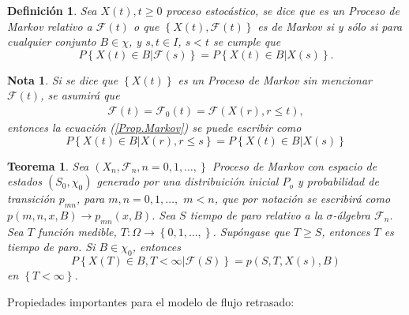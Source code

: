 \documentclass{article}
\newtheorem{Def}{Definición}
\newtheorem{Teo}{Teorema}
\newtheorem{Note}{Nota}
\begin{document}
\begin{Def}
Sea $X\left(t\right),t\geq0$ proceso estoc\'astico, se dice que es un Proceso de Markov relativo a $\mathcal{F}\left(t\right)$ o que $\left\{X\left(t\right),\mathcal{F}\left(t\right)\right\}$ es de Markov si y s\'olo si para cualquier conjunto $B\in\chi$,  y $s,t\in I$, $s<t$ se cumple que
\begin{equation}\label{Prop.Markov}
P\left\{X\left(t\right)\in B|\mathcal{F}\left(s\right)\right\}=P\left\{X\left(t\right)\in B|X\left(s\right)\right\}.
\end{equation}
\end{Def}
\begin{Note}
Si se dice que $\left\{X\left(t\right)\right\}$ es un Proceso de Markov sin mencionar $\mathcal{F}\left(t\right)$, se asumir\'a que
\begin{eqnarray*}
\mathcal{F}\left(t\right)=\mathcal{F}_{0}\left(t\right)=\mathcal{F}\left(X\left(r\right),r\leq t\right),
\end{eqnarray*}
entonces la ecuaci\'on (\ref{Prop.Markov}) se puede escribir como
\begin{equation}
P\left\{X\left(t\right)\in B|X\left(r\right),r\leq s\right\} = P\left\{X\left(t\right)\in B|X\left(s\right)\right\}
\end{equation}
\end{Note}

\begin{Teo}
Sea $\left(X_{n},\mathcal{F}_{n},n=0,1,\ldots,\right\}$ Proceso de Markov con espacio de estados $\left(S_{0},\chi_{0}\right)$ generado por una distribuici\'on inicial $P_{o}$ y probabilidad de transici\'on $p_{mn}$, para $m,n=0,1,\ldots,$ $m<n$, que por notaci\'on se escribir\'a como $p\left(m,n,x,B\right)\rightarrow p_{mn}\left(x,B\right)$. Sea $S$ tiempo de paro relativo a la $\sigma$-\'algebra $\mathcal{F}_{n}$. Sea $T$ funci\'on medible, $T:\Omega\rightarrow\left\{0,1,\ldots,\right\}$. Sup\'ongase que $T\geq S$, entonces $T$ es tiempo de paro. Si $B\in\chi_{0}$, entonces
\begin{equation}\label{Prop.Fuerte.Markov}
P\left\{X\left(T\right)\in B,T<\infty|\mathcal{F}\left(S\right)\right\} = p\left(S,T,X\left(s\right),B\right)
\end{equation}
en $\left\{T<\infty\right\}$.
\end{Teo}

Propiedades importantes para el modelo de flujo retrasado:
\end{document}
